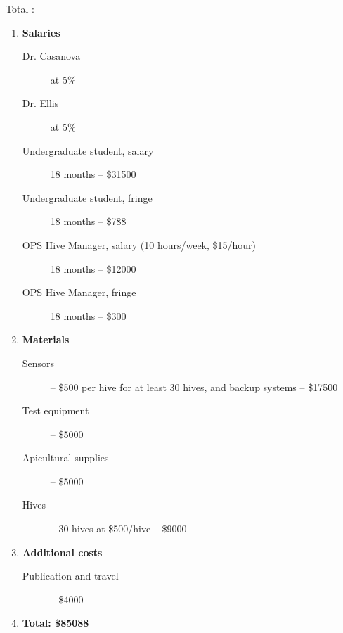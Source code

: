 Total :
\begin{enumerate}
\item \textbf{Salaries}
\begin{description}
\item[Dr. Casanova] at 5\%
\item[Dr. Ellis] at 5\%
\item[Undergraduate student, salary] 18 months -- \$31500
\item[Undergraduate student, fringe] 18 months -- \$788
\item[OPS Hive Manager, salary (10 hours/week, \$15/hour)] 18 months -- \$12000
\item[OPS Hive Manager, fringe] 18 months -- \$300
\end{description}
\item \textbf{Materials}
\begin{description}
\item[Sensors] -- \$500 per hive for at least 30 hives, and backup systems -- \$17500 
\item[Test equipment] -- \$5000 
\item[Apicultural supplies] -- \$5000
\item[Hives] -- 30 hives at \$500/hive -- \$9000
\end{description}
\item \textbf{Additional costs}
\begin{description}
\item[Publication and travel] -- \$4000
\end{description}\item \textbf{Total: \$85088} 
\end{enumerate}
